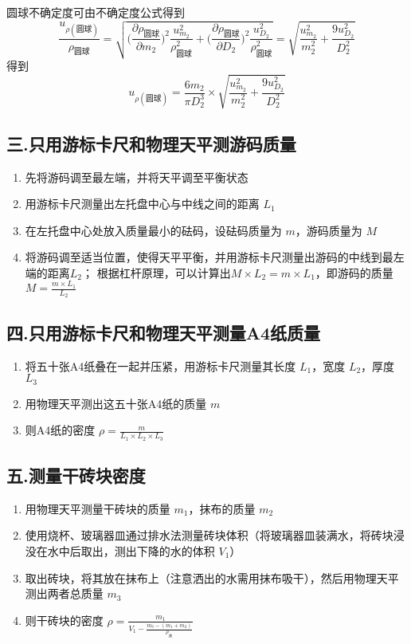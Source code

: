 \documentclass[UTF8]{ctexart}
\begin{document}
圆球不确定度可由不确定度公式得到 
\begin{equation*}
    \frac{u_{\rho(\text{圆球})}}{\rho_{\text{圆球}}} =  \sqrt{
\Big( \frac{\partial \rho_{\text{圆球}} } {\partial m_2} \Big)^2 \frac{u^2_{ m_2}}{\rho_{\text{圆球}}^2}
+ \Big( \frac{\partial \rho_{\text{圆球}} } {\partial D_2} \Big) ^2 \frac{u^2_{ D_2}}{\rho_{\text{圆球}}^2}
} = \sqrt{\frac{u_{m_2}^2}{m_2^2} + \frac{9u_{D_2}^2}{D_2^2}}
\end{equation*}
得到 $$u_{\rho (\text{圆球})} = \frac{6m_2}{\pi D_2^3} \times \sqrt{\frac{u_{m_2}^2}{m_2^2} + \frac{9u_{D_2}^2}{D_2^2}} $$

\subsection{三.只用游标卡尺和物理天平测游码质量}
\begin{enumerate}
    \item 先将游码调至最左端，并将天平调至平衡状态
    \item 用游标卡尺测量出左托盘中心与中线之间的距离 $L_1$ 
    \item 在左托盘中心处放入质量最小的砝码，设砝码质量为 $m$，游码质量为 $M$
    \item 将游码调至适当位置，使得天平平衡，并用游标卡尺测量出游码的中线到最左端的距离$L_2$；
根据杠杆原理，可以计算出$M \times L_2 = m \times L_1$，即游码的质量 $M = \frac{m \times L_1}{L_2}$
\end{enumerate}

\subsection{四.只用游标卡尺和物理天平测量A4纸质量}
\begin{enumerate}
    \item 将五十张A4纸叠在一起并压紧，用游标卡尺测量其长度 $L_1$，宽度 $L_2$，厚度 $L_3$
    \item 用物理天平测出这五十张A4纸的质量 $m$
    \item 则A4纸的密度 $\rho = \frac{m}{L_1 \times L_2 \times L_3}$
\end{enumerate}

\subsection{五.测量干砖块密度}
\begin{enumerate}
    \item 用物理天平测量干砖块的质量 $m_1$，抹布的质量 $m_2$
    \item 使用烧杯、玻璃器皿通过排水法测量砖块体积（将玻璃器皿装满水，将砖块浸没在水中后取出，测出下降的水的体积 $V_1$）
    \item 取出砖块，将其放在抹布上（注意洒出的水需用抹布吸干），然后用物理天平测出两者总质量 $m_3$
    \item 则干砖块的密度 $\rho = \frac{m_1}{V_1 - \frac{m_3-(m_1+m_2)}{\rho_{\textbf{水}}}}$
\end{enumerate}
\end{document}
